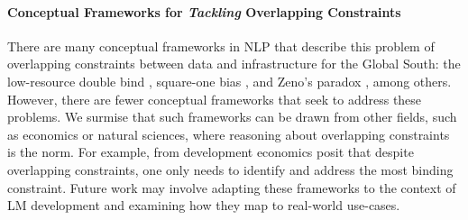 \documentclass[11pt,a4paper]{article}
\begin{document}
\paragraph{Conceptual Frameworks for \textit{Tackling} Overlapping Constraints}
There are many conceptual frameworks in NLP that describe this problem of overlapping constraints between data and infrastructure for the Global South: the low-resource double bind \citep{ahia-etal-2021-low-resource}, square-one bias \citep{ruder-etal-2022-square}, and Zeno's paradox \citep{nigatu-etal-2024-zenos}, among others.
However, there are fewer conceptual frameworks that seek to address these problems.
We surmise that such frameworks can be drawn from other fields, such as economics or natural sciences, where reasoning about overlapping constraints is the norm.
For example, \citet{hausmann2005growth} from development economics posit that despite overlapping constraints, one only needs to identify and address the most binding constraint.
Future work may involve adapting these frameworks to the context of LM development and examining how they map to real-world use-cases.






\end{document}
